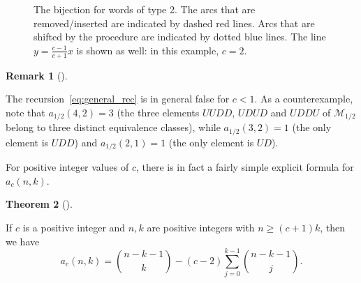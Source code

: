 \documentclass[numbers=enddot,12pt,final,onecolumn,notitlepage]{scrartcl}%
\newcommand{\red}[1]{{\color{red} #1}}
\theoremstyle{definition}
\newtheorem{theo}{Theorem}[section]
\newenvironment{theorem}[1][]
{\begin{theo}[#1]\begin{leftbar}}
{\end{leftbar}\end{theo}}
\newtheorem{remk}[theo]{Remark}
\newenvironment{remark}[1][]
{\begin{remk}[#1]\begin{leftbar}}
{\end{leftbar}\end{remk}}
\newcommand{\M}{\mathcal{M}}
\begin{document}
\begin{figure}[htbp]
\begin{center}
\end{center}
\caption{The bijection for words of type 2. The arcs that are removed/inserted are indicated by dashed red lines. Arcs that are shifted by the procedure are indicated by dotted blue lines. The line $y = \frac{c-1}{c+1} x$ is shown as well: in this example, $c=2$.}
\label{fig.bij2.type.2}
\end{figure}

\begin{remark}
The recursion~\eqref{eq:general_rec} is in general false for $c < 1$. As a counterexample, note that $a_{1/2}(4,2) = 3$ (the three elements $UUDD$, $UDUD$ and $UDDU$ of $\M_{1/2}$ belong to three distinct equivalence classes), while $a_{1/2}(3,2) = 1$ (the only element is $UDD$) and $a_{1/2}(2,1) = 1$ (the only element is $UD$).
\end{remark}

For positive integer values of $c$, there is in fact a fairly simple explicit formula for $a_c(n,k)$.

\begin{theorem}
If $c$ is a positive integer and $n,k$ are positive integers with $n \geq (c+1)k$, then we have
\begin{equation}\label{eq:explicit_general_c}
a_c(n,k) = \binom{n-k-1}{k} - (c-2) \sum_{j=0}^{k-1} \binom{n-k-1}{j}.
\end{equation}
\end{theorem}
\end{document}
